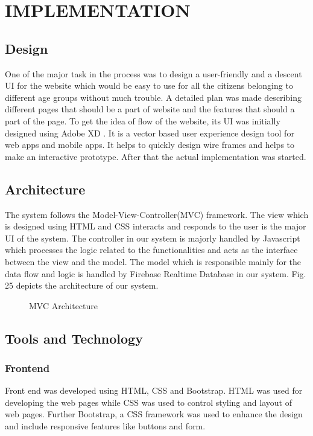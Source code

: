 \documentclass[conference]{IEEEtran}
\begin{document}
\section{IMPLEMENTATION}

\subsection{Design}
One of the major task in the process was to design a user-friendly and a descent UI for the website which would be easy to use for all the citizens belonging to different age groups without much trouble. A detailed plan was made describing different pages that should be a part of website and the features that should a part of the page. To get the idea of flow of the website, its UI was initially designed using Adobe XD . It is a vector based user experience design tool for web apps and mobile apps. It helps to quickly design wire frames and helps to make an interactive prototype. After that the actual implementation was started.
\subsection{Architecture}
The system follows the Model-View-Controller(MVC) framework. The view which is designed using HTML and CSS interacts and responds to the user is the major UI of the system. The controller in our system is majorly handled by Javascript which processes the logic related to the functionalities and acts as the interface between the view and the model. The model which is responsible mainly for the data flow and logic is handled by Firebase Realtime Database in our system. Fig. 25 depicts the architecture of our system.
\begin{figure}[h!]
\centering
{}
\caption{MVC Architecture}
\end{figure}

\subsection{Tools and Technology}
\subsubsection{Frontend}
Front end was developed using HTML, CSS and Bootstrap. HTML was used for developing the web pages while CSS was used to control styling and layout of web pages. Further Bootstrap, a CSS framework was used to enhance the design and include responsive features like buttons and form. 
\end{document}
